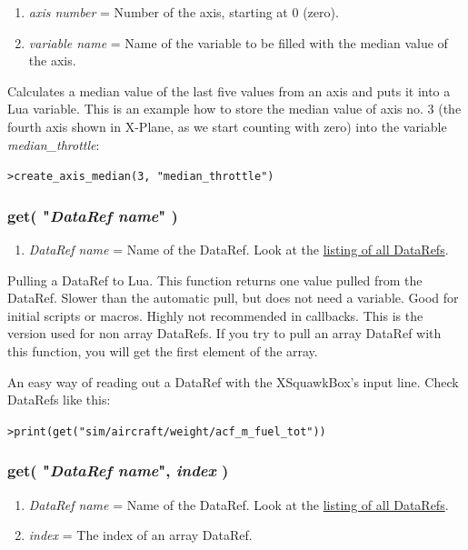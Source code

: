 \documentclass[11pt,parskip=half,a4paper]{scrartcl}
\begin{document}
\begin{enumerate}
	\item \emph{axis number} = Number of the axis, starting at 0 (zero).
	\item \emph{variable name} = Name of the variable to be filled with the median value of the axis.
\end{enumerate}

Calculates a median value of the last five values from an axis and puts it into a Lua variable. This is an example how to store the median value of axis no. 3 (the fourth axis shown in X-Plane, as we start counting with zero) into the variable \emph{median\_throttle}:

\verb|>create_axis_median(3, "median_throttle")|

\subsubsection{get( "\emph{DataRef name}" )}

\begin{enumerate}
	\item \emph{DataRef name} = Name of the DataRef. Look at the \href{http://www.xsquawkbox.net/xpsdk/docs/DataRefs.html}{listing of all DataRefs}.
\end{enumerate}

Pulling a DataRef to Lua. This function returns one value pulled from the DataRef. Slower than the automatic pull, but does not need a variable. Good for initial scripts or macros. Highly not recommended in callbacks. This is the version used for non array DataRefs. If you try to pull an array DataRef with this function, you will get the first element of the array.

An easy way of reading out a DataRef with the XSquawkBox's input line. Check DataRefs like this:

\verb|>print(get("sim/aircraft/weight/acf_m_fuel_tot"))|

\subsubsection{get( "\emph{DataRef name}", \emph{index} )}

\begin{enumerate}
	\item \emph{DataRef name} = Name of the DataRef. Look at the \href{http://www.xsquawkbox.net/xpsdk/docs/DataRefs.html}{listing of all DataRefs}.
	\item \emph{index} = The index of an array DataRef.
\end{enumerate}
\end{document}
